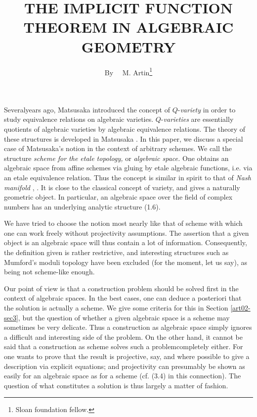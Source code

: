 \title{THE IMPLICIT FUNCTION THEOREM IN ALGEBRAIC GEOMETRY}

\author{By~~ M. Artin\footnote{Sloan foundation fellow.}}

\date{}

\maketitle

\setcounter{pageoriginal}{12}
Several\pageoriginale years ago, Matsusaka introduced the concept of $Q$-{\em variety} in order to study equivalence relations on algebraic varieties. $Q$-{\em varieties} are essentially quotients of algebraic varieties by algebraic equivalence relations. The theory of these structures is developed in Matsusaka \cite{art02-key24}. In this paper, we discuss a special case of Matsusaka's notion in the context of arbitrary schemes. We call the structure {\em scheme for the etale topology,} or {\em algebraic space.} One obtains an algebraic space from affine schemes via gluing by etale algebraic functions, i.e. via an etale equivalence relation. Thus the concept is similar in spirit to that of {\em Nash manifold} \cite{art02-key29}, \cite{art02-key5}. It is close to the classical concept of variety, and gives a naturally geometric object. In particular, an algebraic space over the field of complex numbers has an underlying analytic structure (1.6).

We have tried to choose the notion most nearly like that of scheme with which one can work freely without projectivity assumptions. The assertion that a given object is an algebraic space will thus contain a lot of information. Consequently, the definition given is rather restrictive, and interesting structures such as Mumford's moduli topology \cite{art02-key26} have been excluded (for the moment, let us say), as being not scheme-like enough.

Our point of view is that a construction problem should be solved first in the context of algebraic spaces. In the best cases, one can deduce a posteriori that the solution is actually a scheme. We give some criteria for this in Section \ref{art02-sec3}, but the question of whether a given algebraic space is a scheme may sometimes be very delicate. Thus a construction as algebraic space simply ignores a difficult and interesting side of the problem. On the other hand, it cannot be said that a construction as scheme solves such a problem\pageoriginale completely either. For one wants to prove that the result is projective, say, and where possible to give a description via explicit equations; and projectivity can presumably be shown as easily for an algebraic space as for a scheme (cf. (3.4) in this connection). The question of what constitutes a solution is thus largely a matter of fashion.

